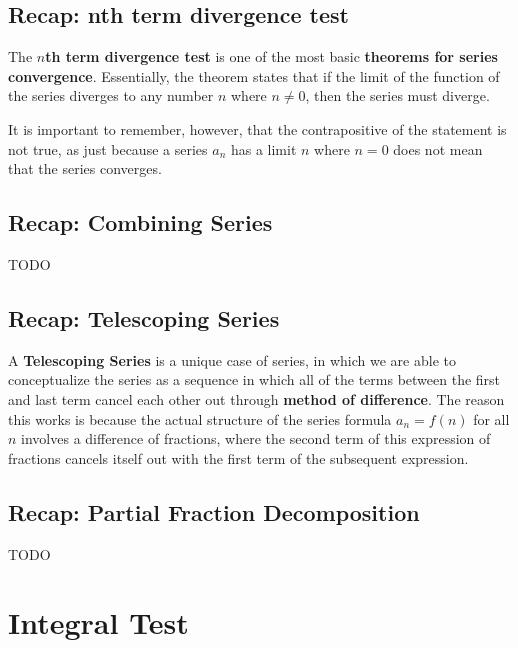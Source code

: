 \documentclass{report}
\begin{document}
\begin{sloppypar}
\begin{itemize}
\end{itemize}

\subsection{Recap: nth term divergence test}
The \textbf{$n$th term divergence test} is
one of the most basic \textbf{theorems for
  series convergence}. Essentially, the
theorem states that if the limit
of the function of the series diverges
to any number $ n $ where $ n \neq 0 $,
then the series must diverge.
\par It is important to remember, however,
that the contrapositive of the statement is not
true, as just because a series $ a_{n} $
has a limit $ n $ where $ n = 0 $ does
not mean that the series converges.

\subsection{Recap: Combining Series}
TODO
\subsection{Recap: Telescoping Series}
A \textbf{Telescoping Series} is a unique
case of series, in which we are able to
conceptualize the series as a sequence
in which all of the terms between the first
and last term cancel each other out through
\textbf{method of difference}. The reason
this works is because the actual structure
of the series formula $ a_{n} = f(n)$ for all
$ n $ involves a difference of fractions, where
the second term of this expression of fractions
cancels itself out with the first term of the
subsequent expression.

\subsection{Recap: Partial Fraction Decomposition}
TODO

\section{Integral Test}

\end{sloppypar}
\end{document}
